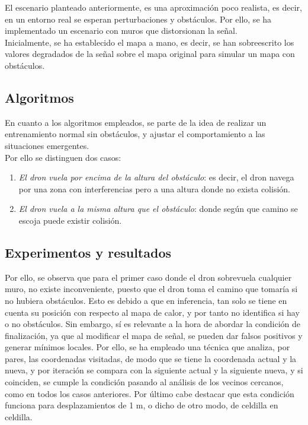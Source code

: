 El escenario planteado anteriormente, es una aproximación poco realista, es decir, en un entorno real se esperan perturbaciones y obstáculos. Por ello, se ha implementado un escenario con muros que distorsionan la señal.\\

Inicialmente, se ha establecido el mapa a mano, es decir, se han sobreescrito los valores degradados de la señal sobre el mapa original para simular un mapa con obstáculos.\\

\subsection{Algoritmos}
\label{subsec:algoritmo_sfo}

En cuanto a los algoritmos empleados, se parte de la idea de realizar un entrenamiento normal sin obstáculos, y ajustar el comportamiento a las situaciones emergentes.\\

Por ello se distinguen dos casos:

\begin{enumerate}
    \item \emph{El dron vuela por encima de la altura del obstáculo}: es decir, el dron navega por una zona con interferencias pero a una altura donde no exista colisión.

    \item \emph{El dron vuela a la misma altura que el obstáculo}: donde según que camino se escoja puede existir colisión.
\end{enumerate}

\subsection{Experimentos y resultados}
\label{subsec:experimentos_sfo}

Por ello, se observa que para el primer caso donde el dron sobrevuela cualquier muro, no existe inconveniente, puesto que el dron toma el camino que tomaría si no hubiera obstáculos. Esto es debido a que en inferencia, tan solo se tiene en cuenta su posición con respecto al mapa de calor, y por tanto no identifica si hay o no obstáculos. Sin embargo, sí es relevante a la hora de abordar la condición de finalización, ya que al modificar el mapa de señal, se pueden dar falsos positivos y generar mínimos locales. Por ello, se ha empleado una técnica que analiza, por pares, las coordenadas visitadas, de modo que se tiene la coordenada actual y la nueva, y por iteración se compara con la siguiente actual y la siguiente nueva, y si coinciden, se cumple la condición pasando al análisis de los vecinos cercanos, como en todos los casos anteriores. Por último cabe destacar que esta condición funciona para desplazamientos de 1 m, o dicho de otro modo, de celdilla en celdilla.\\

